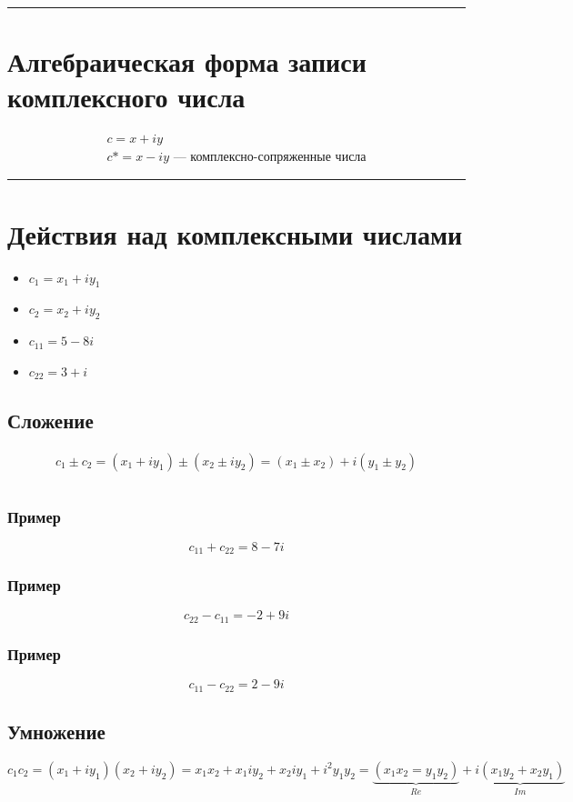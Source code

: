 \documentclass{article}
\begin{document}
\par\noindent\rule{\textwidth}{1pt}
\section{Алгебраическая форма записи комплексного числа}
\begin{gather*}
    c = x + iy \\
    c* = x - iy \text{ --- комплексно-сопряженные числа}
\end{gather*}



\par\noindent\rule{\textwidth}{1pt}
\section{Действия над комплексными числами}
\begin{itemize}
    \item $c_1 = x_1 + iy_1$
    \item $c_2 = x_2 + iy_2$
    \item $c_{11} = 5 - 8i$
    \item $c_{22} = 3 + i$
\end{itemize}

\subsection{Сложение}
\begin{gather*}
    c_1 \pm c_2 = (x_1 + iy_1) \pm (x_2 \pm iy_2) = (x_1 \pm x_2) + i(y_1 \pm y_2) \\ \\
\end{gather*}

\subsubsection{Пример}
\[
    c_{11} + c_{22} = 8 - 7i
\]

\subsubsection{Пример}
\[
    c_{22} - c_{11} = -2 + 9i
\]

\subsubsection{Пример}
\[
    c_{11} - c_{22} = 2 - 9i
\]


\subsection{Умножение}
\[
    c_1 c_2 = (x_1 + iy_1)(x_2 + iy_2) = 
    x_1 x_2 + x_1 i y_2 + x_2 i y_1 + i^2 y_1 y_2 = 
    \underbrace{(x_1 x_2 = y_1 y_2)}_{Re} + \underbrace{i(x_1 y_2 + x_2 y_1)}_{Im}
\]
\end{document}
